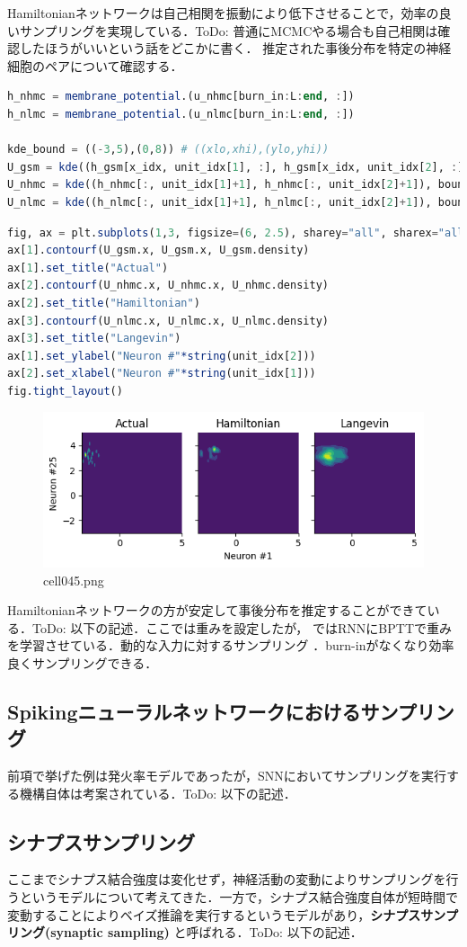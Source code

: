 Hamiltonianネットワークは自己相関を振動により低下させることで，効率の良いサンプリングを実現している．ToDo: 普通にMCMCやる場合も自己相関は確認したほうがいいという話をどこかに書く．
推定された事後分布を特定の神経細胞のペアについて確認する．
\begin{lstlisting}[language=julia]
h_nhmc = membrane_potential.(u_nhmc[burn_in:L:end, :])
h_nlmc = membrane_potential.(u_nlmc[burn_in:L:end, :])

kde_bound = ((-3,5),(0,8)) # ((xlo,xhi),(ylo,yhi))
U_gsm = kde((h_gsm[x_idx, unit_idx[1], :], h_gsm[x_idx, unit_idx[2], :]), boundary=kde_bound)
U_nhmc = kde((h_nhmc[:, unit_idx[1]+1], h_nhmc[:, unit_idx[2]+1]), boundary=kde_bound)
U_nlmc = kde((h_nlmc[:, unit_idx[1]+1], h_nlmc[:, unit_idx[2]+1]), boundary=kde_bound);
\end{lstlisting}
\begin{lstlisting}[language=julia]
fig, ax = plt.subplots(1,3, figsize=(6, 2.5), sharey="all", sharex="all")
ax[1].contourf(U_gsm.x, U_gsm.x, U_gsm.density)
ax[1].set_title("Actual")
ax[2].contourf(U_nhmc.x, U_nhmc.x, U_nhmc.density)
ax[2].set_title("Hamiltonian")
ax[3].contourf(U_nlmc.x, U_nlmc.x, U_nlmc.density)
ax[3].set_title("Langevin")
ax[1].set_ylabel("Neuron #"*string(unit_idx[2]))
ax[2].set_xlabel("Neuron #"*string(unit_idx[1])) 
fig.tight_layout()
\end{lstlisting}
\begin{figure}[ht]
	\centering
	\includegraphics[scale=0.8, max width=\linewidth]{./fig/bayesian-brain/neural-sampling/cell045.png}
	\caption{cell045.png}
	\label{cell045.png}
\end{figure}
Hamiltonianネットワークの方が安定して事後分布を推定することができている．ToDo: 以下の記述．ここでは重みを設定したが， \citep{Echeveste2020-sh}ではRNNにBPTTで重みを学習させている．動的な入力に対するサンプリング \citep{Berkes2011-xj}．burn-inがなくなり効率良くサンプリングできる．
\subsection{Spikingニューラルネットワークにおけるサンプリング}
前項で挙げた例は発火率モデルであったが，SNNにおいてサンプリングを実行する機構自体は考案されている．ToDo: 以下の記述．\citep{Buesing2011-dm}\citep{Masset2022-wh}\citep{Zhang2022-bl}
\subsection{シナプスサンプリング}
ここまでシナプス結合強度は変化せず，神経活動の変動によりサンプリングを行うというモデルについて考えてきた．一方で，シナプス結合強度自体が短時間で変動することによりベイズ推論を実行するというモデルがあり，\textbf{シナプスサンプリング(synaptic sampling)} と呼ばれる．ToDo: 以下の記述．\citep{Kappel2015-kq}\citep{Aitchison2021-wo}
